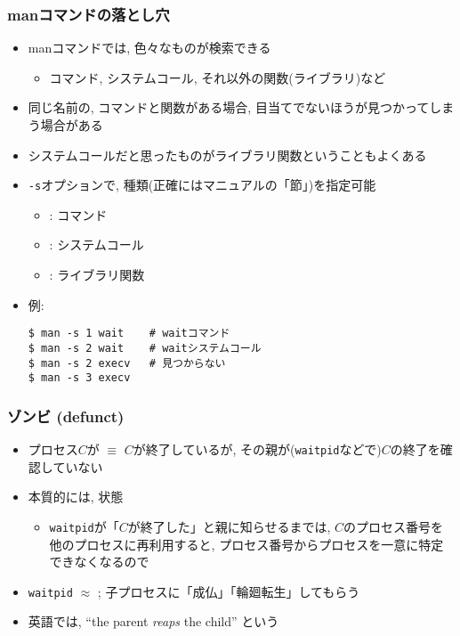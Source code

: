 \documentclass[12pt,dvipdfmx]{beamer}
\begin{document}
\begin{frame}[fragile]
  \frametitle{manコマンドの落とし穴}
  \begin{itemize}
  \item manコマンドでは, 色々なものが検索できる
    \begin{itemize}
    \item コマンド, システムコール, それ以外の関数(ライブラリ)など
    \end{itemize}
  \item 同じ名前の, コマンドと関数がある場合,
    目当てでないほうが見つかってしまう場合がある
  \item システムコールだと思ったものがライブラリ関数ということもよくある
  \item {\tt -s}オプションで, 種類(正確にはマニュアルの「節」)を指定可能
    \begin{itemize}
    \item {} : コマンド
    \item {} : システムコール
    \item {} : ライブラリ関数
    \end{itemize}
  \item 例:
\begin{lstlisting}
$ man -s 1 wait    # waitコマンド
$ man -s 2 wait    # waitシステムコール
$ man -s 2 execv   # 見つからない
$ man -s 3 execv
\end{lstlisting}
  \end{itemize}
\end{frame}

\begin{frame}
\frametitle{ゾンビ (defunct)}
\begin{itemize}
\item プロセス$C$が $\equiv$
  $C$が終了しているが, その親が({\tt waitpid}などで)$C$の終了を確認していない
\item 本質的には, 状態
  \begin{itemize}
  \item {\tt waitpid}が「$C$が終了した」と親に知らせるまでは,
    $C$のプロセス番号を他のプロセスに再利用すると,
    プロセス番号からプロセスを一意に特定できなくなるので
  \end{itemize}
\item {\tt waitpid} $\approx$ ;
  子プロセスに「成仏」「輪廻転生」してもらう
\item 英語では, ``the parent {\it reaps} the child'' という
\end{itemize}
\end{frame}
\end{document}

